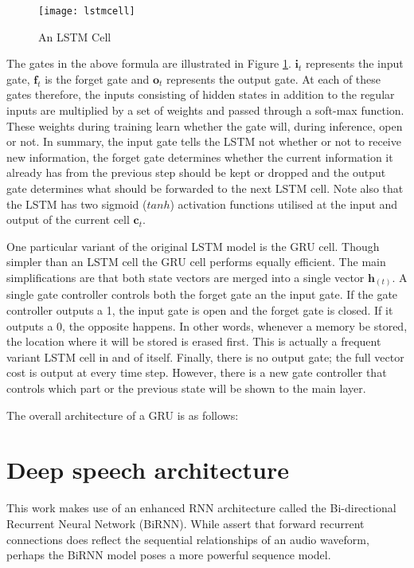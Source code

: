\begin{figure}
\centering
  \texttt{[image: lstmcell]}\\
  \caption{An LSTM Cell \cite{graves2013hybrid}}\label{fig_3_3_lstmcell}
\end{figure}

The gates in the above formula are illustrated in Figure \ref{fig_3_3_lstmcell}.  $\mathbf{i}_t$ represents the input gate, $\mathbf{f}_t$ is the forget gate and $\mathbf{o}_t$ represents the output gate.  At each of these gates therefore, the inputs consisting of hidden states in addition to the regular inputs are multiplied by a set of weights and passed through a soft-max function. These weights during training learn whether the gate will, during inference, open or not.  In summary, the input gate tells the LSTM not whether or not to receive new information, the forget gate determines whether the current information it already has from the previous step should be kept or dropped and the output gate determines what should be forwarded to the next LSTM cell.  Note also that the LSTM has two sigmoid ($tanh$) activation functions utilised at the input and output of the current cell $\mathbf{c}_t$.

One particular variant of the original LSTM model is the GRU cell. Though simpler than an LSTM cell the GRU cell performs equally efficient.  The main simplifications are that both state vectors are merged into a single vector $\mathbf{h}_{(t)}$. A single gate controller controls both the forget gate an the input gate.   If the gate controller outputs a 1, the input gate is open and the forget gate is closed.  If it outputs a 0, the opposite happens.  In other words, whenever a memory be stored, the location where it will be stored is erased first.  This is actually a frequent variant LSTM cell in and of itself. Finally, there is no output gate; the full vector cost is output at every time step.  However, there is a new gate controller that controls which part or the previous state will be shown to the main layer.

The overall architecture of a GRU is as follows:

\section{Deep speech architecture}

This work makes use of an enhanced RNN architecture called the Bi-directional Recurrent Neural Network (BiRNN). While \cite{hannun2014first} assert that forward recurrent connections does reflect the sequential relationships of an audio waveform, perhaps the BiRNN model poses a more powerful sequence model.

